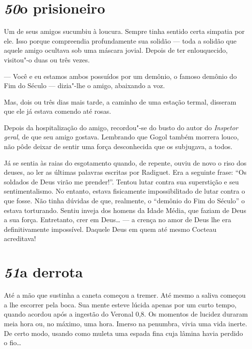 \section*{\textit{50}\es o prisioneiro}

Um de seus amigos sucumbiu à loucura. Sempre tinha sentido certa
simpatia por ele. Isso porque compreendia profundamente sua solidão ---
toda a solidão que aquele amigo ocultava sob uma máscara jovial. Depois
de ter enlouquecido, visitou"-o duas ou três vezes.

--- Você e eu estamos ambos possuídos por um demônio, o famoso demônio do
Fim do Século --- dizia"-lhe o amigo, abaixando a voz.

Mas, dois ou três dias mais tarde, a caminho de uma estação termal,
disseram que ele já estava comendo até rosas.

Depois da hospitalização do amigo, recordou"-se do busto do autor do
\textit{Inspetor geral}, de que seu amigo gostava. Lembrando que Gogol
também morrera louco, não pôde deixar de sentir uma força desconhecida
que os subjugava, a todos.

Já se sentia às raias do esgotamento quando, de repente, ouviu de novo o
riso dos deuses, ao ler as últimas palavras escritas por Radiguet. Era
a seguinte frase: ``Os soldados de Deus virão me prender!''. Tentou lutar
contra sua superstição e seu sentimentalismo. No entanto, estava
fisicamente impossibilitado de lutar contra o que fosse. Não tinha
dúvidas de que, realmente, o ``demônio do Fim do Século'' o estava
torturando. Sentiu inveja dos homens da Idade Média, que faziam de Deus
a sua força. Entretanto, crer em Deus\ldots{} --- a crença no amor de Deus lhe
era definitivamente impossível. Daquele Deus em quem até mesmo Cocteau
acreditava!

\section*{\textit{51}\es a derrota}

Até a mão que sustinha a caneta começou a tremer. Até mesmo a saliva
começou a lhe escorrer pela boca. Sua mente esteve lúcida apenas por um
curto tempo, quando acordou após a ingestão do Veronal 0,8. Os momentos
de lucidez duraram meia hora ou, no máximo, uma hora. Imerso na
penumbra, vivia uma vida inerte. De certo modo, usando como muleta uma
espada fina cuja lâmina havia perdido o fio\ldots{}

